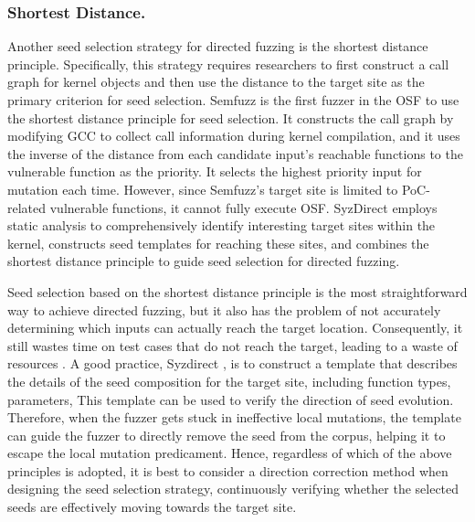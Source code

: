 \subsubsection{Shortest Distance.}
Another seed selection strategy for directed fuzzing is the shortest distance principle. Specifically, this strategy requires researchers to first construct a call graph for kernel objects and then use the distance to the target site as the primary criterion for seed selection. Semfuzz \cite{you2017semfuzz} is the first fuzzer in the OSF to use the shortest distance principle for seed selection. It constructs the call graph by modifying GCC to collect call information during kernel compilation, and it uses the inverse of the distance from each candidate input's reachable functions to the vulnerable function as the priority. It selects the highest priority input for mutation each time. However, since Semfuzz's target site is limited to PoC-related vulnerable functions, it cannot fully execute OSF. SyzDirect \cite{tan2023syzdirect} employs static analysis to comprehensively identify interesting target sites within the kernel, constructs seed templates for reaching these sites, and combines the shortest distance principle to guide seed selection for directed fuzzing.

Seed selection based on the shortest distance principle is the most straightforward way to achieve directed fuzzing, but it also has the problem of not accurately determining which inputs can actually reach the target location. Consequently, it still wastes time on test cases that do not reach the target, leading to a waste of resources \cite{Huang2022BEACONDG, Zong2020FuzzGuardFO}. A good practice, Syzdirect \cite{tan2023syzdirect}, is to construct a template that describes the details of the seed composition for the target site, including function types, parameters, \etc This template can be used to verify the direction of seed evolution. Therefore, when the fuzzer gets stuck in ineffective local mutations, the template can guide the fuzzer to directly remove the seed from the corpus, helping it to escape the local mutation predicament. Hence, regardless of which of the above principles is adopted, it is best to consider a direction correction method when designing the seed selection strategy, continuously verifying whether the selected seeds are effectively moving towards the target site.

